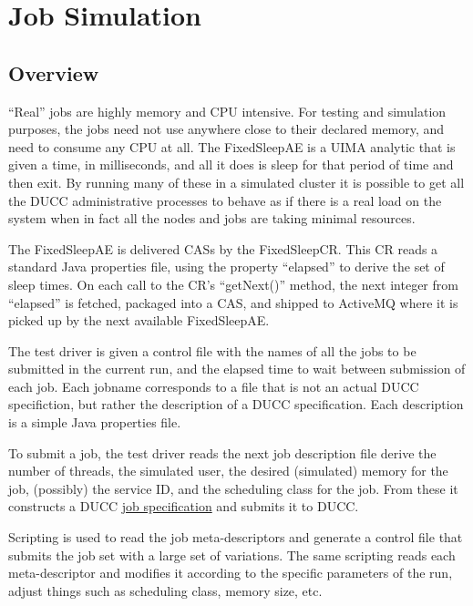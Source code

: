 \section{Job Simulation}

    \subsection{Overview}
     ``Real'' jobs are highly memory and CPU intensive.  For testing and simulation
     purposes, the jobs need not use anywhere close to their declared memory, and
     need to consume any CPU at all.  The FixedSleepAE is a UIMA analytic that
     is given a time, in milliseconds, and all it does is sleep for that period
     of time and then exit.  By running many of these in a simulated cluster
     it is possible to get all the DUCC administrative processes to behave 
     as if there is a real load on the system when in fact all the nodes and
     jobs are taking minimal resources.

     The FixedSleepAE is delivered CASs by the FixedSleepCR.  This CR reads
     a standard Java properties file, using the property ``elapsed'' to derive the
     set of sleep times.  On each call to the CR's ``getNext()'' method, the next
     integer from ``elapsed'' is fetched, packaged into a CAS, and shipped to
     ActiveMQ where it is picked up by the next available FixedSleepAE.

     The test driver is given a control file with the names of all the jobs to be
     submitted in the current run, and the elapsed time to wait between submission
     of each job. Each jobname corresponds to a file that is not an actual
     DUCC specifiction, but rather the description of a DUCC specification.  Each
     description is a simple Java properties file.

     To submit a job, the test driver reads the next job description file
     derive the number of 
     threads, the simulated user, the desired (simulated) memory for the job,
     (possibly) the service ID, and the scheduling class for the job.  From these
     it constructs a DUCC \hyperref[sec:cli.ducc-submit]{job specification} and submits it to DUCC.

     Scripting is used to read the job meta-descriptors and generate a control
     file that submits the job set with a large set of variations.  The same scripting
     reads each meta-descriptor and modifies it according to the specific parameters
     of the run, adjust things such as scheduling class, memory size, etc.
     

